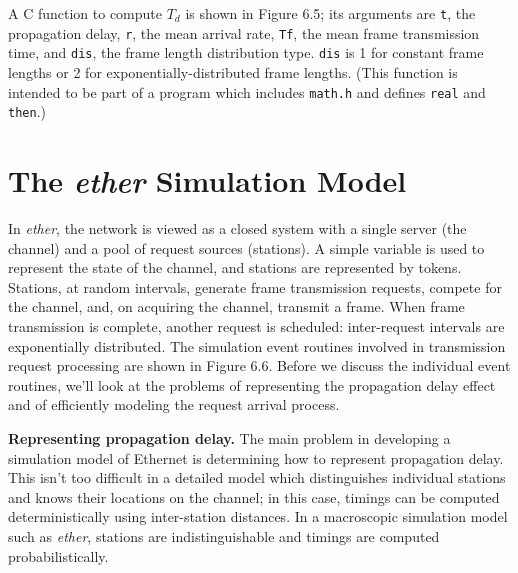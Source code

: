 A C function to compute $T_d$ is shown in Figure 6.5; its arguments are \texttt{t}, the propagation delay, \texttt{r}, the mean arrival rate, \texttt{Tf}, the mean frame transmission time, and \texttt{dis}, the frame length distribution type. \texttt{dis} is 1 for constant frame lengths or 2 for exponentially-distributed frame lengths. (This function is intended to be part of a program which includes \texttt{math.h} and defines \texttt{real} and \texttt{then}.)

\section{The \emph{ether} Simulation Model}

In \emph{ether}, the network is viewed as a closed system with a single server (the channel) and a pool of request sources (stations). A simple variable is used to represent the state of the channel, and stations are represented by tokens. Stations, at random intervals, generate frame transmission requests, compete for the channel, and, on acquiring the channel, transmit a frame. When frame transmission is complete, another request is scheduled: inter-request intervals are exponentially distributed. The simulation event routines involved in transmission request processing are shown in Figure 6.6. Before we discuss the individual event routines, we'll look at the problems of representing the propagation delay effect and of efficiently modeling the request arrival process.

\noindent\textbf{Representing propagation delay.} The main problem in developing a simulation model of Ethernet is determining how to represent propagation delay. This isn't too difficult in a detailed model which distinguishes individual stations and knows their locations on the channel; in this case, timings can be computed deterministically using inter-station distances. In a macroscopic simulation model such as \emph{ether}, stations are indistinguishable and timings are computed probabilistically.

